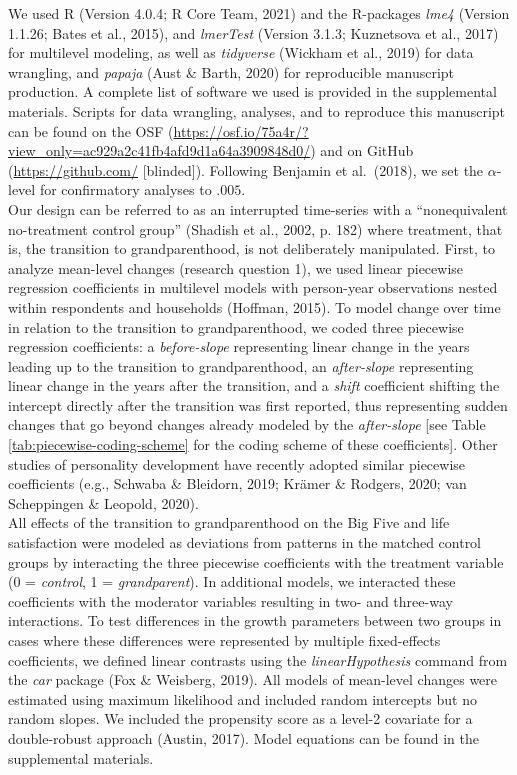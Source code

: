 \documentclass[
  english,
  man, noextraspace]{apa7}
\begin{document}
We used R (Version 4.0.4; R Core Team, 2021) and the R-packages \emph{lme4} (Version 1.1.26; Bates et al., 2015), and \emph{lmerTest} (Version 3.1.3; Kuznetsova et al., 2017) for multilevel modeling, as well as \emph{tidyverse} (Wickham et al., 2019) for data wrangling, and \emph{papaja} (Aust \& Barth, 2020) for reproducible manuscript production. A complete list of software we used is provided in the supplemental materials. Scripts for data wrangling, analyses, and to reproduce this manuscript can be found on the OSF (\url{https://osf.io/75a4r/?view_only=ac929a2c41fb4afd9d1a64a3909848d0/}) and on GitHub (\url{https://github.com/} {[}blinded{]}). Following Benjamin et al.~(2018), we set the \(\alpha\)-level for confirmatory analyses to \(.005\).\\
Our design can be referred to as an interrupted time-series with a \enquote{nonequivalent no-treatment control group} (Shadish et al., 2002, p. 182) where treatment, that is, the transition to grandparenthood, is not deliberately manipulated. First, to analyze mean-level changes (research question 1), we used linear piecewise regression coefficients in multilevel models with person-year observations nested within respondents and households (Hoffman, 2015). To model change over time in relation to the transition to grandparenthood, we coded three piecewise regression coefficients: a \emph{before-slope} representing linear change in the years leading up to the transition to grandparenthood, an \emph{after-slope} representing linear change in the years after the transition, and a \emph{shift} coefficient shifting the intercept directly after the transition was first reported, thus representing sudden changes that go beyond changes already modeled by the \emph{after-slope} {[}see Table \ref{tab:piecewise-coding-scheme} for the coding scheme of these coefficients{]}. Other studies of personality development have recently adopted similar piecewise coefficients (e.g., Schwaba \& Bleidorn, 2019; Krämer \& Rodgers, 2020; van Scheppingen \& Leopold, 2020).\\
All effects of the transition to grandparenthood on the Big Five and life satisfaction were modeled as deviations from patterns in the matched control groups by interacting the three piecewise coefficients with the treatment variable (0 = \emph{control}, 1 = \emph{grandparent}). In additional models, we interacted these coefficients with the moderator variables resulting in two- and three-way interactions. To test differences in the growth parameters between two groups in cases where these differences were represented by multiple fixed-effects coefficients, we defined linear contrasts using the \emph{linearHypothesis} command from the \emph{car} package (Fox \& Weisberg, 2019). All models of mean-level changes were estimated using maximum likelihood and included random intercepts but no random slopes. We included the propensity score as a level-2 covariate for a double-robust approach (Austin, 2017). Model equations can be found in the supplemental materials.\\
\end{document}
